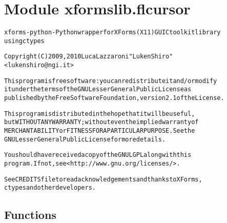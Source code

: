 %
%
%


\section{Module xformslib.flcursor}

    \label{xformslib:flcursor}
\begin{alltt}

xforms-python - Python wrapper for XForms (X11) GUI C toolkit library
using ctypes

Copyright (C) 2009, 2010  Luca Lazzaroni "LukenShiro"
    {\textless}lukenshiro@ngi.it{\textgreater}

This program is free software: you can redistribute it and/or modify
it under the terms of the GNU Lesser General Public License as
published by the Free Software Foundation, version 2.1 of the License.

This program is distributed in the hope that it will be useful,
but WITHOUT ANY WARRANTY; without even the implied warranty of
MERCHANTABILITY or FITNESS FOR A PARTICULAR PURPOSE. See the
GNU Lesser General Public License for more details.

You should have received a copy of the GNU LGPL along with this
program. If not, see {\textless}http://www.gnu.org/licenses/{\textgreater}.

See CREDITS file to read acknowledgements and thanks to XForms,
ctypes and other developers.
\end{alltt}



  \subsection{Functions}

    \label{xformslib:flcursor:fl_set_cursor}

